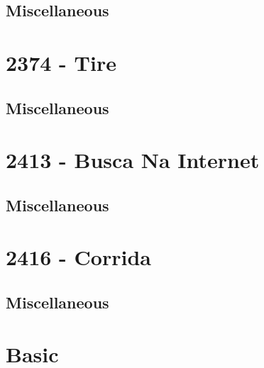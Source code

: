 \subsection{Miscellaneous}
\raggedbottom
\vspace{-.7\baselineskip}\hrulefill
\vspace{0.1\baselineskip}
\section{2374 - Tire}
\subsection{Miscellaneous}
\raggedbottom
\vspace{-.7\baselineskip}\hrulefill
\vspace{0.1\baselineskip}
\section{2413 - Busca Na Internet}
\subsection{Miscellaneous}
\raggedbottom
\vspace{-.7\baselineskip}\hrulefill
\vspace{0.1\baselineskip}
\section{2416 - Corrida}
\subsection{Miscellaneous}
\raggedbottom
\vspace{-.7\baselineskip}\hrulefill
\vspace{0.1\baselineskip}
\section{Basic}
